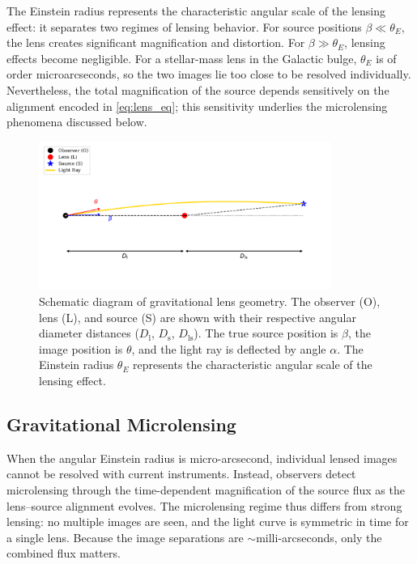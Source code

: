 The Einstein radius represents the characteristic angular scale of the lensing effect: it separates two regimes of lensing behavior. For source positions $\beta \ll \theta_E$, the lens creates significant magnification and distortion. For $\beta \gg \theta_E$, lensing effects become negligible. For a stellar-mass lens in the Galactic bulge, $\theta_E$ is of order microarcseconds, so the two images lie too close to be resolved individually. Nevertheless, the total magnification of the source depends sensitively on the alignment encoded in \cref{eq:lens_eq}; this sensitivity underlies the microlensing phenomena discussed below.

\begin{figure}[htbp]
    \centering
    \includegraphics[width=0.85\textwidth]{figures/fig_lens_geometry.pdf}
    \caption[Gravitational lens geometry.]{Schematic diagram of gravitational lens geometry. The observer (O), lens (L), and source (S) are shown with their respective angular diameter distances ($D_\mathrm{l}$, $D_\mathrm{s}$, $D_\mathrm{ls}$). The true source position is $\beta$, the image position is $\theta$, and the light ray is deflected by angle $\alpha$. The Einstein radius $\theta_E$ represents the characteristic angular scale of the lensing effect.}
    \label{fig:lens_geometry}
\end{figure}

\subsection{Gravitational Microlensing}
\label{sec:microlensing_basics}

When the angular Einstein radius is micro-arcsecond, individual lensed images cannot be resolved with current instruments. Instead, observers detect microlensing through the time-dependent magnification of the source flux as the lens–source alignment evolves. The microlensing regime thus differs from strong lensing: no multiple images are seen, and the light curve is symmetric in time for a single lens. Because the image separations are ${\sim}$milli-arcseconds, only the combined flux matters.

